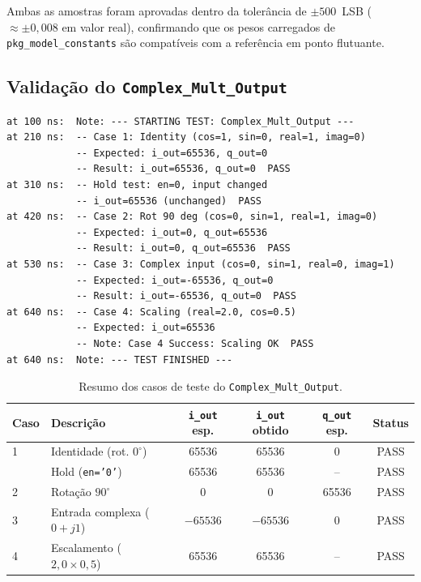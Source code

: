 \documentclass[a4paper,12pt]{article}
\begin{document}
Ambas as amostras foram aprovadas dentro da toler\^ancia de $\pm500$~LSB ($\approx \pm0{,}008$ em valor real), confirmando que os pesos carregados de \texttt{pkg\_model\_constants} s\~ao compat\'iveis com a refer\^encia em ponto flutuante.

\subsection{Valida\c{c}\~ao do \texttt{Complex\_Mult\_Output}}

\begin{lstlisting}[style=logstyle,
    caption={Log do ISim -- valida\c{c}\~ao do \texttt{Complex\_Mult\_Output}.},
    label={lst:log_cmult}]
at 100 ns:  Note: --- STARTING TEST: Complex_Mult_Output ---
at 210 ns:  -- Case 1: Identity (cos=1, sin=0, real=1, imag=0)
            -- Expected: i_out=65536, q_out=0
            -- Result: i_out=65536, q_out=0  PASS
at 310 ns:  -- Hold test: en=0, input changed
            -- i_out=65536 (unchanged)  PASS
at 420 ns:  -- Case 2: Rot 90 deg (cos=0, sin=1, real=1, imag=0)
            -- Expected: i_out=0, q_out=65536
            -- Result: i_out=0, q_out=65536  PASS
at 530 ns:  -- Case 3: Complex input (cos=0, sin=1, real=0, imag=1)
            -- Expected: i_out=-65536, q_out=0
            -- Result: i_out=-65536, q_out=0  PASS
at 640 ns:  -- Case 4: Scaling (real=2.0, cos=0.5)
            -- Expected: i_out=65536
            -- Note: Case 4 Success: Scaling OK  PASS
at 640 ns:  Note: --- TEST FINISHED ---
\end{lstlisting}

\begin{table}[H]
\centering
\caption{Resumo dos casos de teste do \texttt{Complex\_Mult\_Output}.}
\small
\begin{tabular}{llcccc}
\hline
\textbf{Caso} & \textbf{Descri\c{c}\~ao} & \textbf{\texttt{i\_out} esp.} & \textbf{\texttt{i\_out} obtido} & \textbf{\texttt{q\_out} esp.} & \textbf{Status} \\
\hline
1 & Identidade (rot. $0^\circ$)   & 65536   & 65536   & 0      & PASS \\
  & Hold (\texttt{en='0'})        & 65536   & 65536   & --     & PASS \\
2 & Rota\c{c}\~ao $90^\circ$     & 0       & 0       & 65536  & PASS \\
3 & Entrada complexa ($0+j1$)     & $-65536$& $-65536$& 0      & PASS \\
4 & Escalamento ($2{,}0 \times 0{,}5$) & 65536 & 65536 & --  & PASS \\
\hline
\end{tabular}
\end{table}
\end{document}
